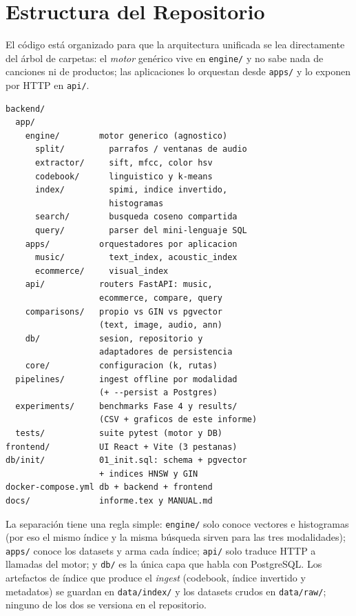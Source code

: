 \documentclass[conference]{IEEEtran}
\begin{document}
\section{Estructura del Repositorio}

El código está organizado para que la arquitectura unificada se lea
directamente del árbol de carpetas: el \emph{motor} genérico vive en
\texttt{engine/} y no sabe nada de canciones ni de productos; las
aplicaciones lo orquestan desde \texttt{apps/} y lo exponen por HTTP en
\texttt{api/}.

\begin{lstlisting}
backend/
  app/
    engine/        motor generico (agnostico)
      split/         parrafos / ventanas de audio
      extractor/     sift, mfcc, color hsv
      codebook/      linguistico y k-means
      index/         spimi, indice invertido,
                     histogramas
      search/        busqueda coseno compartida
      query/         parser del mini-lenguaje SQL
    apps/          orquestadores por aplicacion
      music/         text_index, acoustic_index
      ecommerce/     visual_index
    api/           routers FastAPI: music,
                   ecommerce, compare, query
    comparisons/   propio vs GIN vs pgvector
                   (text, image, audio, ann)
    db/            sesion, repositorio y
                   adaptadores de persistencia
    core/          configuracion (k, rutas)
  pipelines/       ingest offline por modalidad
                   (+ --persist a Postgres)
  experiments/     benchmarks Fase 4 y results/
                   (CSV + graficos de este informe)
  tests/           suite pytest (motor y DB)
frontend/          UI React + Vite (3 pestanas)
db/init/           01_init.sql: schema + pgvector
                   + indices HNSW y GIN
docker-compose.yml db + backend + frontend
docs/              informe.tex y MANUAL.md
\end{lstlisting}

La separación tiene una regla simple: \texttt{engine/} solo conoce vectores e
histogramas (por eso el mismo índice y la misma búsqueda sirven para las tres
modalidades); \texttt{apps/} conoce los datasets y arma cada índice;
\texttt{api/} solo traduce HTTP a llamadas del motor; y \texttt{db/} es la
única capa que habla con PostgreSQL. Los artefactos de índice que produce el
\textit{ingest} (codebook, índice invertido y metadatos) se guardan en
\texttt{data/index/} y los datasets crudos en \texttt{data/raw/}; ninguno de
los dos se versiona en el repositorio.
\end{document}
